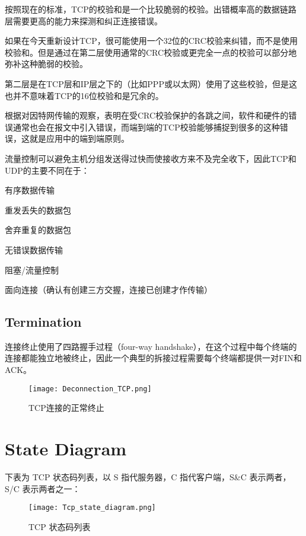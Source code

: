 按照现在的标准，TCP的校验和是一个比较脆弱的校验。出错概率高的数据链路层需要更高的能力来探测和纠正连接错误。

如果在今天重新设计TCP，很可能使用一个32位的CRC校验来纠错，而不是使用校验和。但是通过在第二层使用通常的CRC校验或更完全一点的校验可以部分地弥补这种脆弱的校验。

第二层是在TCP层和IP层之下的（比如PPP或以太网）使用了这些校验，但是这也并不意味着TCP的16位校验和是冗余的。

根据对因特网传输的观察，表明在受CRC校验保护的各跳之间，软件和硬件的错误通常也会在报文中引入错误，而端到端的TCP校验能够捕捉到很多的这种错误，这就是应用中的端到端原则。

流量控制可以避免主机分组发送得过快而使接收方来不及完全收下，因此TCP和UDP的主要不同在于：

\begin{compactitem}
\item 有序数据传输
\item 重发丢失的数据包
\item 舍弃重复的数据包
\item 无错误数据传输
\item 阻塞/流量控制
\item 面向连接（确认有创建三方交握，连接已创建才作传输）
\end{compactitem}

\subsection{Termination}

连接终止使用了四路握手过程（four-way handshake），在这个过程中每个终端的连接都能独立地被终止，因此一个典型的拆接过程需要每个终端都提供一对FIN和ACK。

\begin{figure}[htbp]
\centering
\texttt{[image: Deconnection\_TCP.png]}
\caption{TCP连接的正常终止}
\end{figure}


\section{State Diagram}

下表为 TCP 状态码列表，以 S 指代服务器，C 指代客户端，S\&C 表示两者，S/C 表示两者之一：

\begin{figure}[htbp]
\centering
\texttt{[image: Tcp\_state\_diagram.png]}
\caption{TCP 状态码列表}
\end{figure}

